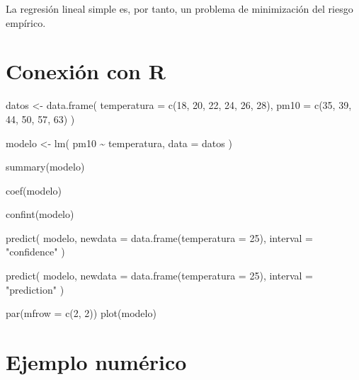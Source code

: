 \documentclass[
  spanish,
  11pt,
  letterpaper,
  DIV=11,
  numbers=noendperiod]{scrreprt}
\newenvironment{Shaded}{\begin{snugshade}}{\end{snugshade}}
\newcommand{\AttributeTok}[1]{\textcolor[rgb]{0.40,0.45,0.13}{#1}}
\newcommand{\DecValTok}[1]{\textcolor[rgb]{0.68,0.00,0.00}{#1}}
\newcommand{\FunctionTok}[1]{\textcolor[rgb]{0.28,0.35,0.67}{#1}}
\newcommand{\NormalTok}[1]{\textcolor[rgb]{0.00,0.23,0.31}{#1}}
\newcommand{\OtherTok}[1]{\textcolor[rgb]{0.00,0.23,0.31}{#1}}
\newcommand{\SpecialCharTok}[1]{\textcolor[rgb]{0.37,0.37,0.37}{#1}}
\newcommand{\StringTok}[1]{\textcolor[rgb]{0.13,0.47,0.30}{#1}}
\theoremstyle{definition}
\theoremstyle{plain}
\theoremstyle{definition}
\theoremstyle{remark}
\begin{document}
La regresión lineal simple es, por tanto, un problema de minimización
del riesgo empírico.

\section{Conexión con R}\label{conexiuxf3n-con-r-8}

\begin{Shaded}
\begin{Highlighting}[]
\NormalTok{datos }\OtherTok{\textless{}{-}} \FunctionTok{data.frame}\NormalTok{(}
  \AttributeTok{temperatura =} \FunctionTok{c}\NormalTok{(}\DecValTok{18}\NormalTok{, }\DecValTok{20}\NormalTok{, }\DecValTok{22}\NormalTok{, }\DecValTok{24}\NormalTok{, }\DecValTok{26}\NormalTok{, }\DecValTok{28}\NormalTok{),}
  \AttributeTok{pm10 =} \FunctionTok{c}\NormalTok{(}\DecValTok{35}\NormalTok{, }\DecValTok{39}\NormalTok{, }\DecValTok{44}\NormalTok{, }\DecValTok{50}\NormalTok{, }\DecValTok{57}\NormalTok{, }\DecValTok{63}\NormalTok{)}
\NormalTok{)}

\NormalTok{modelo }\OtherTok{\textless{}{-}} \FunctionTok{lm}\NormalTok{(}
\NormalTok{  pm10 }\SpecialCharTok{\textasciitilde{}}\NormalTok{ temperatura,}
  \AttributeTok{data =}\NormalTok{ datos}
\NormalTok{)}

\FunctionTok{summary}\NormalTok{(modelo)}

\FunctionTok{coef}\NormalTok{(modelo)}

\FunctionTok{confint}\NormalTok{(modelo)}

\FunctionTok{predict}\NormalTok{(}
\NormalTok{  modelo,}
  \AttributeTok{newdata =} \FunctionTok{data.frame}\NormalTok{(}\AttributeTok{temperatura =} \DecValTok{25}\NormalTok{),}
  \AttributeTok{interval =} \StringTok{"confidence"}
\NormalTok{)}

\FunctionTok{predict}\NormalTok{(}
\NormalTok{  modelo,}
  \AttributeTok{newdata =} \FunctionTok{data.frame}\NormalTok{(}\AttributeTok{temperatura =} \DecValTok{25}\NormalTok{),}
  \AttributeTok{interval =} \StringTok{"prediction"}
\NormalTok{)}

\FunctionTok{par}\NormalTok{(}\AttributeTok{mfrow =} \FunctionTok{c}\NormalTok{(}\DecValTok{2}\NormalTok{, }\DecValTok{2}\NormalTok{))}
\FunctionTok{plot}\NormalTok{(modelo)}
\end{Highlighting}
\end{Shaded}

\section{Ejemplo numérico}\label{ejemplo-numuxe9rico}
\end{document}
